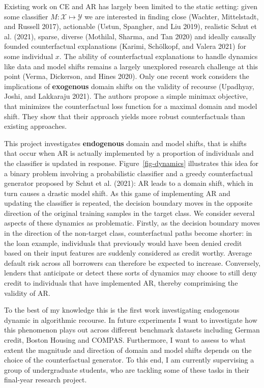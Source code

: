 \documentclass[
  sigconf]{acmart}
\begin{document}
Existing work on CE and AR has largely been limited to the static
setting: given some classifier \(M: \mathcal{X} \mapsto \mathcal{Y}\) we
are interested in finding close (Wachter, Mittelstadt, and Russell
2017), actionable (Ustun, Spangher, and Liu 2019), realistic Schut et
al. (2021), sparse, diverse (Mothilal, Sharma, and Tan 2020) and ideally
causally founded counterfactual explanations (Karimi, Schölkopf, and
Valera 2021) for some individual \(x\). The ability of counterfactual
explanations to handle dynamics like data and model shifts remains a
largely unexplored research challenge at this point (Verma, Dickerson,
and Hines 2020). Only one recent work considers the implications of
\textbf{exogenous} domain shifts on the validity of recourse (Upadhyay,
Joshi, and Lakkaraju 2021). The authors propose a simple minimax
objective, that minimizes the counterfactual loss function for a maximal
domain and model shift. They show that their approach yields more robust
counterfactuals than existing approaches.

This project investigates \textbf{endogenous} domain and model shifts,
that is shifts that occur when AR is actually implemented by a
proportion of individuals and the classifier is updated in response.
Figure~\ref{fig-dynamics} illustrates this idea for a binary problem
involving a probabilistic classifier and a greedy counterfactual
generator proposed by Schut et al. (2021): AR leads to a domain shift,
which in turn causes a drastic model shift. As this game of implementing
AR and updating the classifier is repeated, the decision boundary moves
in the opposite direction of the original training samples in the target
class. We consider several aspects of these dynamics as problematic.
Firstly, as the decision boundary moves in the direction of the
non-target class, counterfactual paths become shorter: in the loan
example, individuals that previously would have been denied credit based
on their input features are suddenly considered as credit worthy.
Average default risk across all borrowers can therefore be expected to
increase. Conversely, lenders that anticipate or detect these sorts of
dynamics may choose to still deny credit to individuals that have
implemented AR, thereby comprimising the validity of AR.

To the best of my knowledge this is the first work investigating
endogenous dynamic in algorithmic recourse. In future experiments I want
to investigate how this phenomenon plays out across different benchmark
datasets including German credit, Boston Housing and COMPAS.
Furthermore, I want to assess to what extent the magnitude and direction
of domain and model shifts depends on the choice of the counterfactual
generator. To this end, I am currently supervising a group of
undergraduate students, who are tackling some of these tasks in their
final-year research project.
\end{document}
